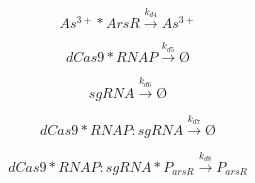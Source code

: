 \documentclass[a4paper,10pt]{article}
\begin{document}
\begin{equation}
As^{3+}*ArsR\stackrel{k_{d4}}{\longrightarrow}As^{3+}
\end{equation}

\begin{equation}
dCas9*RNAP\stackrel{k_{d5}}{\longrightarrow}Ø
\end{equation}

\begin{equation}
sgRNA\stackrel{k_{d6}}{\longrightarrow}Ø
\end{equation}


\begin{equation}
dCas9*RNAP:sgRNA\stackrel{k_{d7}}{\longrightarrow}Ø
\end{equation}


\begin{equation}
dCas9*RNAP:sgRNA*P_{arsR}\stackrel{k_{d8}}{\longrightarrow}P_{arsR}
\end{equation}
\end{document}
